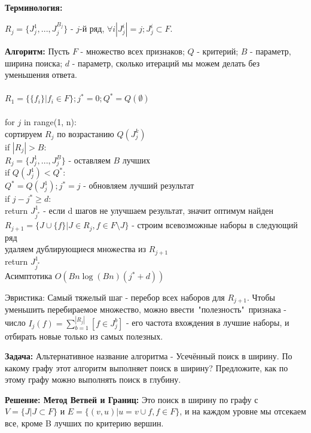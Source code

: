 \textbf{Терминология:}

$R_j = \{ J_j^{1}, ..., J_j^{B_j}\}$ - $j$-й ряд, $\forall i |J_j^{i}| = j; J_j^{i} \subset F$.

\textbf{Алгоритм:} Пусть $F$ - множество всех признаков; $Q$ - критерий; $B$ - параметр, ширина поиска; $d$ - параметр, сколько итераций мы можем делать без уменьшения ответа.
\\\\
$R_1 = \{ \{f_i\} | f_i \in F\}; j^* = 0; Q^* = Q(\emptyset)$
\\\\
for $j$ in range(1, n):\\
\indent    сортируем $R_j$ по возрастанию $Q(J_j^{k})$\\
\indent    if $|R_j|>B$:\\
\indent    \indent    $R_j = \{J_j^{1}, ..., J_j^{B}\}$ - оставляем $B$ лучших\\
\indent    if $Q(J_j^{1})<Q^*$:\\
\indent    \indent    $Q^* = Q(J_j^{1}); j^* = j$ - обновляем лучший результат\\
\indent    if $j-j^* \geq d$:\\
\indent    \indent    return $J_{j^*}^{1}$ - если d шагов не улучшаем результат, значит оптимум найден\\
\indent    $R_{j+1} = \{J \cup \{f\} | J \in R_j, f \in F \setminus J\}$ - строим всевозможные наборы в следующий ряд\\
\indent    удаляем дублирующиеся множества из $R_{j+1}$\\
return $J_{j^*}^{1}$\\

Асимптотика $O(B n\log(B n) (j^*+d) )$

Эвристика: Самый тяжелый шаг - перебор всех наборов для $R_{j+1}$. Чтобы уменьшить перебираемое множество, можно ввести\ "полезность"\ признака - число $I_j(f) = \sum_{b=1}^{|R_j|} [f \in J_{j}^{b}]$ - 
его частота вхождения в лучшие наборы, и отбирать новые только из самых полезных.

\textbf{Задача:} Альтернативное название алгоритма - Усечённый поиск в ширину. По какому графу этот алгоритм выполняет поиск в ширину? Предложите, как по этому графу можно выполнять поиск в глубину.

\textbf{Решение: Метод Ветвей и Границ:} Это поиск в ширину по графу с $V=\{J| J \subset F\}$ и $E=\{(v,u)|u=v \cup f, f \in F\}$, и на каждом уровне мы отсекаем все, кроме B лучших по критерию вершин.

